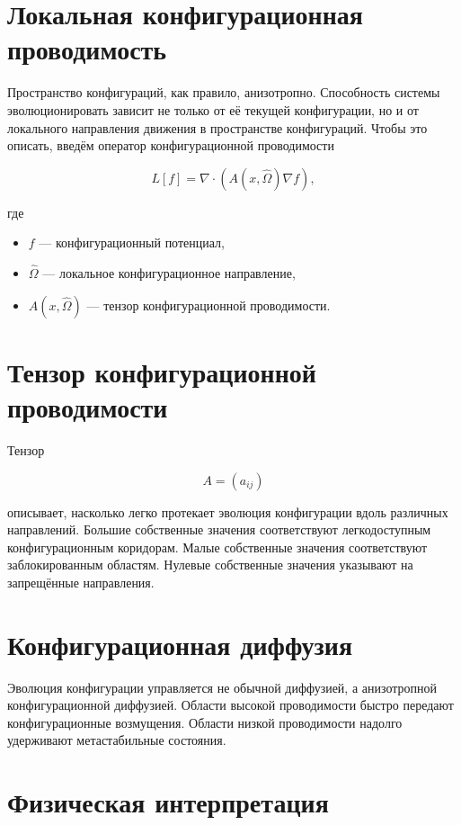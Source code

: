 \section{Локальная конфигурационная проводимость}

Пространство конфигураций, как правило, анизотропно. Способность системы эволюционировать зависит не только от её текущей конфигурации, но и от локального направления движения в пространстве конфигураций. Чтобы это описать, введём оператор конфигурационной проводимости

\[ \boxed{ L[f] = \nabla \cdot \left( A(x,\hat{\Omega}) \nabla f \right), } \]

где

\begin{itemize}
\item $f$ — конфигурационный потенциал,
\item $\hat{\Omega}$ — локальное конфигурационное направление,
\item $A(x,\hat{\Omega})$
— тензор конфигурационной проводимости.
\end{itemize}

\section{Тензор конфигурационной проводимости}

Тензор

\[ A = (a_{ij}) \]

описывает, насколько легко протекает эволюция конфигурации вдоль различных направлений. Большие собственные значения соответствуют легкодоступным конфигурационным коридорам. Малые собственные значения соответствуют заблокированным областям. Нулевые собственные значения указывают на запрещённые направления.

\section{Конфигурационная диффузия}

Эволюция конфигурации управляется не обычной диффузией, а анизотропной конфигурационной диффузией. Области высокой проводимости быстро передают конфигурационные возмущения. Области низкой проводимости надолго удерживают метастабильные состояния.

\section{Физическая интерпретация}

